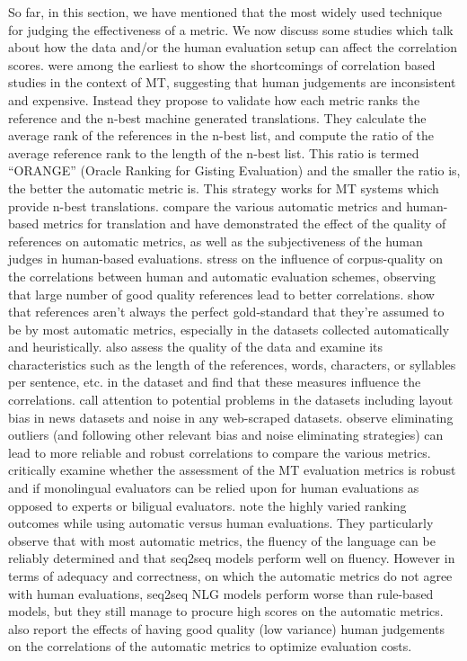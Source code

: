 So far, in this section, we have mentioned that the most widely used technique for judging the effectiveness of a metric. We now discuss some studies which talk about how the data 
and/or the human evaluation setup can affect the correlation scores.  were among the earliest to show the shortcomings of correlation based studies in the context of MT, suggesting that human judgements are inconsistent and expensive. Instead they propose to validate how each metric ranks the reference and the n-best machine generated translations. They calculate  the  average  rank  of   the   references in the n-best list, and compute the ratio of  the  average  reference  rank  to  the  length  of the n-best list. This ratio is termed “ORANGE” (Oracle Ranking for Gisting Evaluation) and the smaller the ratio is, the better the automatic metric is.  This strategy works for MT systems which provide n-best translations.  compare the various automatic metrics and human-based metrics for translation and have demonstrated the effect of the quality of references on automatic metrics, as well as the subjectiveness of the human judges in human-based evaluations.   stress on the influence of corpus-quality on the correlations between human and automatic evaluation schemes, observing that large number of good quality references lead to better correlations.  show that references aren't always the perfect gold-standard that they're assumed to be by most automatic metrics, especially in the datasets collected automatically and heuristically.
 also assess the quality of the data and examine its characteristics such as the length of the references, words,  characters, or syllables per sentence, etc. in the dataset and find that these measures influence the correlations. 
 call attention to potential problems in the datasets including layout bias in news datasets and noise in any web-scraped datasets.  observe eliminating outliers (and following other relevant bias and noise eliminating strategies) can lead to more reliable and robust correlations to compare the various metrics. \\
 critically examine whether the assessment of the MT evaluation metrics is robust and if monolingual evaluators can be relied upon for human evaluations as opposed to experts or biligual evaluators. 
 note the highly varied ranking outcomes while using automatic versus human evaluations. They particularly observe that with most automatic metrics, the fluency of the language can be reliably determined and that seq2seq models perform well on fluency. However in terms of adequacy and correctness, on which the automatic metrics do not agree with human evaluations, seq2seq NLG models perform worse than rule-based models, but they still manage to procure high scores on the automatic metrics. 
 also report the effects of having good quality (low variance) human judgements on the correlations of the automatic metrics to optimize evaluation costs.

